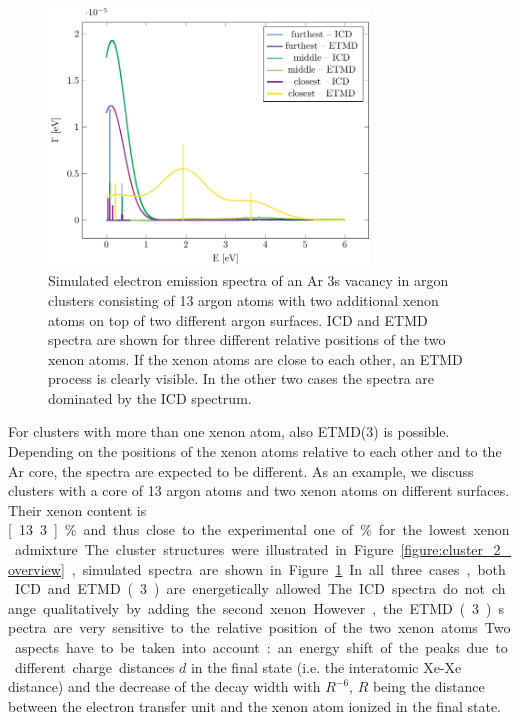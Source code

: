 \documentclass[journal=jpccck,manuscript=article]{achemso}
\begin{document}
\begin{figure}[ht]
 \centering
 \includegraphics[width=8.5cm]{2tops.pdf}
 \caption{Simulated electron emission spectra of an Ar 3s vacancy in 
          argon clusters consisting of 13
          argon atoms with two additional xenon atoms on top of two different
          argon surfaces. ICD and ETMD spectra are shown for three
          different relative positions of the two xenon atoms. If 
          the xenon atoms are close to each other, an ETMD process is
          clearly visible. In the other two cases the spectra are dominated by
          the ICD spectrum.}
 \label{figure:2tops}
\end{figure}
%
For clusters with more than one xenon atom, also ETMD(3) is possible.
Depending on the positions of the xenon atoms relative to each other and to the Ar core, the spectra are expected to be different.
As an example, we discuss clusters with a core of 13 argon atoms and two xenon atoms on different surfaces. 
Their xenon content is \unit[13.3]{\%} and thus close to the experimental one of \unit[10-12]{\%} for the lowest xenon admixture.
The cluster structures were illustrated in Figure \ref{figure:cluster_2_overview}, simulated spectra are shown in Figure \ref{figure:2tops}.
In all three cases, both ICD and ETMD(3) are energetically allowed. The ICD
spectra do not change qualitatively by adding the second xenon.
However, the ETMD(3) spectra
are very sensitive to the relative position of the two xenon atoms.
Two aspects have to be taken into account: an energy shift of the peaks due
to different charge distances $d$ in the final state (i.e. the interatomic Xe-Xe
distance) and the decrease of the decay width with $R^{-6}$, $R$ being the distance
between the electron transfer unit and the xenon atom ionized in the final state.
\end{document}
